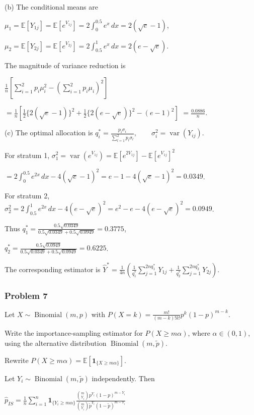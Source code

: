 (b) The conditional means are

$\mu_1=\mathbb{E}[Y_{1j}]=\mathbb{E}[e^{V_{1j}}]=2\int_0^{0.5}e^x\,dx=2(\sqrt e-1)$,

$\mu_2=\mathbb{E}[Y_{2j}]=\mathbb{E}[e^{V_{2j}}]=2\int_{0.5}^1e^x\,dx=2(e-\sqrt e)$.

The magnitude of variance reduction is

$\frac1n\left[\sum_{i=1}^2p_i\mu_i^2-\left(\sum_{i=1}^2p_i\mu_i\right)^2\right]$

$=\frac1n\left[\frac12\{2(\sqrt e-1)\}^2+\frac12\{2(e-\sqrt e)\}^2-(e-1)^2\right]$
$=\frac{0.0886}{n}$.

(c) The optimal allocation is
$q_i^*=\frac{p_i\sigma_i}{\sum_{l=1}^2p_l\sigma_l},\qquad \sigma_i^2=\operatorname{var}(Y_{ij})$.

For stratum 1,
$\sigma_1^2=\operatorname{var}(e^{V_{1j}})=\mathbb{E}[e^{2V_{1j}}]-\mathbb{E}[e^{V_{1j}}]^2$

$=2\int_0^{0.5}e^{2x}\,dx-4(\sqrt e-1)^2=e-1-4(\sqrt e-1)^2=0.0349$.

For stratum 2,
$\sigma_2^2=2\int_{0.5}^1e^{2x}\,dx-4(e-\sqrt e)^2=e^2-e-4(e-\sqrt e)^2=0.0949$.

Thus
$q_1^*=\frac{0.5\sqrt{0.0349}}{0.5\sqrt{0.0349}+0.5\sqrt{0.0949}}=0.3775$,

$q_2^*=\frac{0.5\sqrt{0.0949}}{0.5\sqrt{0.0349}+0.5\sqrt{0.0949}}=0.6225$.

The corresponding estimator is
$\widehat Y^*=\frac1{4n}\left(\frac1{q_1^*}\sum_{j=1}^{2nq_1^*}Y_{1j}+\frac1{q_2^*}\sum_{j=1}^{2nq_2^*}Y_{2j}\right)$.

\subsubsection*{Problem 7}

 Let $X\sim\operatorname{Binomial}(m,p)$ with
$P(X=k)=\frac{m!}{(m-k)!k!}p^k(1-p)^{m-k}$.

Write the importance-sampling estimator for $P(X\geq m\alpha)$, where $\alpha\in(0,1)$, using the alternative distribution $\operatorname{Binomial}(m,\widetilde p)$.

 Rewrite
$P(X\geq m\alpha)=\mathbb{E}[\mathbf1_{\{X\geq m\alpha\}}]$.

Let $Y_i\sim\operatorname{Binomial}(m,\widetilde p)$ independently. Then

$\widehat p_{IS}=\frac1n\sum_{i=1}^n\mathbf1_{\{Y_i\geq m\alpha\}}\frac{\binom m{Y_i}p^{Y_i}(1-p)^{m-Y_i}}{\binom m{Y_i}\widetilde p^{Y_i}(1-\widetilde p)^{m-Y_i}}$

